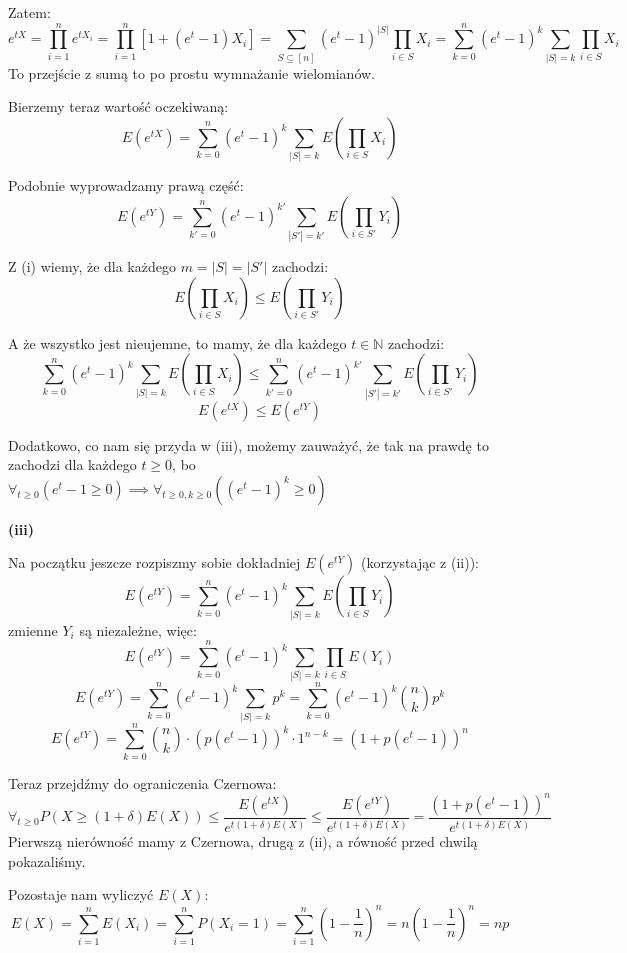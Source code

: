 Zatem:
\[
	e^{tX} = \prod_{i=1}^n e^{t X_i} = \prod_{i=1}^n \left[1 + (e^t - 1) X_i\right]
	= \sum_{S \subseteq [n]} (e^t - 1)^{|S|} \prod_{i \in S} X_i
	= \sum_{k=0}^n (e^t - 1)^k \sum_{|S| = k} \prod_{i \in S} X_i
\]
To przejście z sumą to po prostu wymnażanie wielomianów.

Bierzemy teraz wartość oczekiwaną:
\[
	E(e^{tX}) = \sum_{k=0}^n (e^t - 1)^k \sum_{|S| = k} E\left(\prod_{i \in S} X_i\right)
\]

Podobnie wyprowadzamy prawą część:
\[
	E(e^{tY}) = \sum_{k'=0}^n (e^t - 1)^{k'} \sum_{|S'| = k'} E\left(\prod_{i \in S'} Y_i\right)
\]

Z (i) wiemy, że dla każdego \(m = |S| = |S'|\) zachodzi:
\[E\left(\prod_{i \in S} X_i\right) \le E\left(\prod_{i \in S'} Y_i\right)\]

A że wszystko jest nieujemne, to mamy, że dla każdego \(t \in \mathbb{N}\) zachodzi:
\[
	\sum_{k=0}^n (e^t - 1)^k \sum_{|S| = k} E\left(\prod_{i \in S} X_i\right)
	\le
	\sum_{k'=0}^n (e^t - 1)^{k'} \sum_{|S'| = k'} E\left(\prod_{i \in S'} Y_i\right)
\]
\[E(e^{tX}) \le E(e^{tY})\]

Dodatkowo, co nam się przyda w (iii), możemy zauważyć, że tak na prawdę to zachodzi
dla każdego \(t \ge 0\), bo \(\forall_{t \ge 0} \left( e^{t} - 1 \ge 0 \right) \implies \forall_{t \ge 0, k \ge 0} \left( (e^{t} - 1)^{k} \ge 0\right)\)

\textbf{(iii)}

Na początku jeszcze rozpiszmy sobie dokładniej \(E(e^{tY})\) (korzystając z (ii)):
\[
	E(e^{tY}) = \sum_{k=0}^n (e^t - 1)^{k} \sum_{|S| = k} E\left(\prod_{i \in S} Y_i\right)
\]
zmienne \(Y_i\) są niezależne, więc:
\[
	E(e^{tY}) = \sum_{k=0}^n (e^t - 1)^{k} \sum_{|S| = k} \prod_{i \in S} E(Y_i)
\]
\[
	E(e^{tY}) = \sum_{k=0}^n (e^t - 1)^{k} \sum_{|S| = k} p^{k} = \sum_{k=0}^n (e^t - 1)^{k} \binom{n}{k} p^{k}
\]
\[
	E(e^{tY}) = \sum_{k=0}^n \binom{n}{k} \cdot \left(p(e^t - 1)\right)^{k} \cdot 1^{n-k} = \left(1 + p(e^t - 1)\right)^{n}
\]

Teraz przejdźmy do ograniczenia Czernowa:
\[
	\forall_{t \ge 0} P(X \ge (1 + \delta) E(X)) \le \frac{E(e^{tX})}{e^{t(1 + \delta) E(X)}} \le \frac{E(e^{tY})}{e^{t(1 + \delta) E(X)}} = \frac{\left(1 + p(e^t - 1)\right)^{n}}{e^{t(1 + \delta) E(X)}}
\]
Pierwszą nierówność mamy z Czernowa, drugą z (ii), a równość przed chwilą pokazaliśmy.

Pozostaje nam wyliczyć \(E(X)\):
\[
	E(X) = \sum_{i=1}^n E(X_i) = \sum_{i=1}^n P(X_i = 1) = \sum_{i=1}^n \left(1 - \frac{1}{n}\right)^n = n \left(1 - \frac{1}{n}\right)^n = n p
\]


